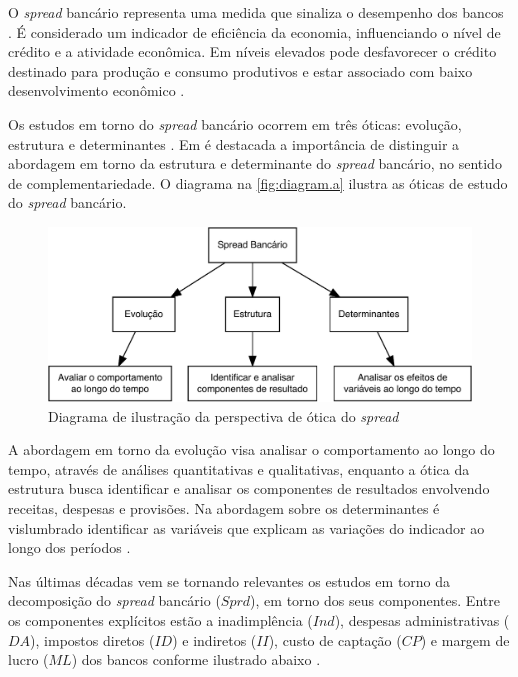 \documentclass[
  12pt,
  12pt,
  openright,
  oneside,
  a4paper,
  chapter=TITLE,
  section=TITLE,
  subsection=TITLE,
  subsubsection=TITLE,
  english,
  portugues,
  sumario=tradicional]{abntex2}
\begin{document}
O \emph{spread} bancário representa uma medida que sinaliza o desempenho dos bancos \cite{levine:1997}. É considerado um indicador de eficiência da economia, influenciando o nível de crédito e a atividade econômica. Em níveis elevados pode desfavorecer o crédito destinado para produção e consumo produtivos e estar associado com baixo desenvolvimento econômico \cite{WB:2005}.

Os estudos em torno do \emph{spread} bancário ocorrem em três óticas: evolução, estrutura e determinantes \cite{dick:1999}. Em \textcite{dick:1999} é destacada a importância de distinguir a abordagem em torno da estrutura e determinante do \emph{spread} bancário, no sentido de complementariedade. O diagrama na \autoref{fig:diagram.a} ilustra as óticas de estudo do \emph{spread} bancário.

\begin{figure}[!htbp]
\vspace{20pt}
\caption{Diagrama de ilustração da perspectiva de ótica do \emph{spread}}
\vspace{-4mm}

\begin{center}\includegraphics{12-exportedfigures/diagram.spread.otic-1} \end{center}
\vspace{-3mm}
\label{fig:diagram.a}
\vspace{-2mm}
\end{figure}

A abordagem em torno da evolução visa analisar o comportamento ao longo do tempo, através de análises quantitativas e qualitativas, enquanto a ótica da estrutura busca identificar e analisar os componentes de resultados envolvendo receitas, despesas e provisões. Na abordagem sobre os determinantes é vislumbrado identificar as variáveis que explicam as variações do indicador ao longo dos períodos \cite{dick:1999}.

Nas últimas décadas vem se tornando relevantes os estudos em torno da decomposição do \emph{spread} bancário (\(Sprd\)), em torno dos seus componentes. Entre os componentes explícitos estão a inadimplência (\(Ind\)), despesas administrativas (\(DA\)), impostos diretos (\(ID\)) e indiretos (\(II\)), custo de captação (\(CP\)) e margem de lucro (\(ML\)) dos bancos conforme ilustrado abaixo \cite{BCB:2000}.
\end{document}
